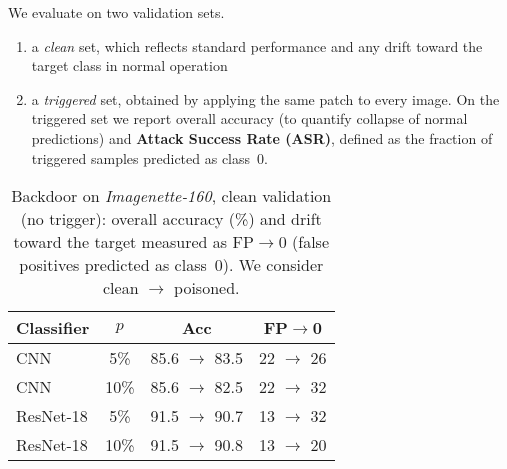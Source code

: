 \documentclass{article}
\begin{document}
We evaluate on two validation sets.
\begin{enumerate}[noitemsep, topsep=2pt, parsep=0pt, partopsep=0pt, leftmargin=*]
  \item a \emph{clean} set, which reflects standard performance and any drift toward the target class in normal operation
  \item a \emph{triggered} set, obtained by applying the same patch to every image. On the triggered set we report overall accuracy (to quantify collapse of normal predictions) and \textbf{Attack Success Rate (ASR)}, defined as the fraction of triggered samples predicted as class~0.
\end{enumerate}

\begin{table}[H]
  \caption{Backdoor on \textit{Imagenette-160}, clean validation (no trigger): overall accuracy (\%) and drift toward the target measured as FP$\to$0 (false positives predicted as class~0). We consider clean $\rightarrow$ poisoned.}
  \label{tab:backdoor-clean}
  \centering
  \begin{small}
    \begin{tabular}{lccc}
      \toprule
      Classifier & $p$ & Acc & FP$\to$0 \\
      \midrule
      CNN        & 5\%  & 85.6 $\rightarrow$ 83.5 & 22 $\rightarrow$ 26 \\
      CNN        & 10\% & 85.6 $\rightarrow$ 82.5 & 22 $\rightarrow$ 32 \\
      ResNet-18\footnotemark[5] & 5\%  & 91.5 $\rightarrow$ 90.7 & 13 $\rightarrow$ 32 \\
      ResNet-18\footnotemark[5] & 10\% & 91.5 $\rightarrow$ 90.8 & 13 $\rightarrow$ 20 \\
      \bottomrule
    \end{tabular}
  \end{small}
  \vspace{-0.35cm}
\end{table}
\end{document}
